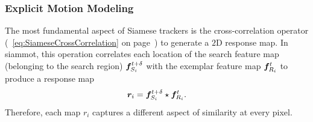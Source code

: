 \subsubsection{Explicit Motion Modeling}

The most fundamental aspect of Siamese trackers is the cross-correlation operator (\sectiontext{}~\ref{eq:SiameseCrossCorrelation} on page~\pageref{eq:SiameseCrossCorrelation}) to generate a $2$D response map. In \gls{siammot}, this operation correlates each location of the search feature map (belonging to the search region) $\bm{f}_{S_i}^{t + \delta}$ with the exemplar feature map $\bm{f}_{R_i}^{t}$ to produce a response map
\begin{equation}
    \bm{r}_{i} = \bm{f}_{S_i}^{t + \delta} \star \bm{f}_{R_i}^{t}.
\end{equation}
Therefore, each map $r_i$ captures a different aspect of similarity at every pixel.

